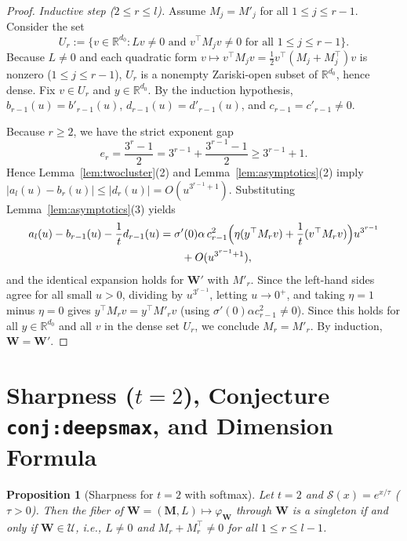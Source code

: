 \documentclass[11pt]{article}
\theoremstyle{plain}
\newtheorem{proposition}{Proposition}
\theoremstyle{definition}
\theoremstyle{remark}
\newcommand{\R}{\mathbb{R}}
\newcommand{\calS}{\mathcal{S}}
\newcommand{\calU}{\mathcal{U}}
\newcommand{\bfW}{\mathbf{W}}
\newcommand{\bfM}{\mathbf{M}}
\begin{document}
\begin{proof}
\emph{Inductive step ($2 \le r \le l$).}
Assume $M_j = M'_j$ for all $1 \le j \le r - 1$. Consider the set
\[
U_r := \bigl\{v \in \R^{d_0} : L v \neq 0 \text{ and } v^\top M_j v \neq 0 \text{ for all } 1 \le j \le r - 1\bigr\}.
\]
Because $L \neq 0$ and each quadratic form $v \mapsto v^\top M_j v = \frac{1}{2} v^\top (M_j + M_j^\top) v$ is nonzero ($1 \le j \le r - 1$), $U_r$ is a nonempty Zariski-open subset of $\R^{d_0}$, hence dense. Fix $v \in U_r$ and $y \in \R^{d_0}$. By the induction hypothesis, $b_{r-1}(u) = b'_{r-1}(u)$, $d_{r-1}(u) = d'_{r-1}(u)$, and $c_{r-1} = c'_{r-1} \neq 0$.

Because $r \ge 2$, we have the strict exponent gap
\[
e_r = \frac{3^r - 1}{2} = 3^{r-1} + \frac{3^{r-1} - 1}{2} \ge 3^{r-1} + 1.
\]
Hence Lemma~\ref{lem:twocluster}(2) and Lemma~\ref{lem:asymptotics}(2) imply $|a_l(u) - b_r(u)| \le |d_r(u)| = O(u^{3^{r-1}+1})$. Substituting Lemma~\ref{lem:asymptotics}(3) yields
\begin{align*}
a_l(u) - b_{r-1}(u) - \frac{1}{t} d_{r-1}(u)
&= \sigma'(0)\alpha\, c_{r-1}^2\Bigl(\eta (y^\top M_r v) + \frac{1}{t} (v^\top M_r v)\Bigr) u^{3^{r-1}} \\
&\qquad + O(u^{3^{r-1}+1}),
\end{align*}
and the identical expansion holds for $\bfW'$ with $M'_r$. Since the left-hand sides agree for all small $u > 0$, dividing by $u^{3^{r-1}}$, letting $u \to 0^+$, and taking $\eta = 1$ minus $\eta = 0$ gives $y^\top M_r v = y^\top M'_r v$ (using $\sigma'(0)\alpha c_{r-1}^2 \neq 0$). Since this holds for all $y \in \R^{d_0}$ and all $v$ in the dense set $U_r$, we conclude $M_r = M'_r$. By induction, $\bfW = \bfW'$.
\end{proof}

\section{Sharpness ($t = 2$), Conjecture \texttt{conj:deepsmax}, and Dimension Formula}

\begin{proposition}[Sharpness for $t = 2$ with softmax]\label{prop:sharp}
Let $t = 2$ and $\calS(x) = e^{x/\tau}$ ($\tau > 0$). Then the fiber of $\bfW = (\bfM, L) \mapsto \varphi_{\bfW}$ through $\bfW$ is a singleton \emph{if and only if} $\bfW \in \calU$, i.e., $L \neq 0$ and $M_r + M_r^\top \neq 0$ for all $1 \le r \le l - 1$.
\end{proposition}
\end{document}
